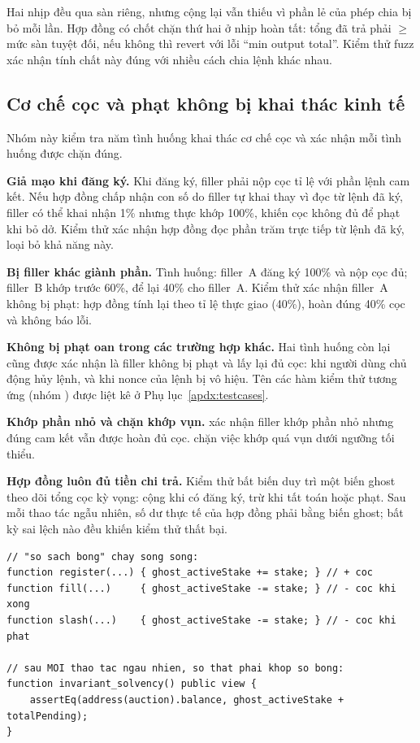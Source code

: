 \documentclass[../DoAn.tex]{subfiles}
\begin{document}
Hai nhịp đều qua sàn riêng, nhưng cộng lại vẫn thiếu vì phần lẻ của phép chia bị bỏ mỗi lần. Hợp đồng có chốt chặn thứ hai ở nhịp hoàn tất: tổng đã trả phải $\geq$ mức sàn tuyệt đối, nếu không thì revert với lỗi ``min output total''. Kiểm thử fuzz  xác nhận tính chất này đúng với nhiều cách chia lệnh khác nhau.

\subsection{Cơ chế cọc và phạt không bị khai thác kinh tế}

Nhóm này kiểm tra năm tình huống khai thác cơ chế cọc và xác nhận mỗi tình huống được chặn đúng.

\textbf{Giả mạo khi đăng ký.} Khi đăng ký, filler phải nộp cọc tỉ lệ với phần lệnh cam kết. Nếu hợp đồng chấp nhận con số do filler tự khai thay vì đọc từ lệnh đã ký, filler có thể khai nhận 1\% nhưng thực khớp 100\%, khiến cọc không đủ để phạt khi bỏ dở. Kiểm thử  xác nhận hợp đồng đọc phần trăm trực tiếp từ lệnh đã ký, loại bỏ khả năng này.

\textbf{Bị filler khác giành phần.} Tình huống: filler~A đăng ký 100\% và nộp cọc đủ; filler~B khớp trước 60\%, để lại 40\% cho filler~A. Kiểm thử  xác nhận filler~A không bị phạt: hợp đồng tính lại theo tỉ lệ thực giao (40\%), hoàn đúng 40\% cọc và không báo lỗi.

\textbf{Không bị phạt oan trong các trường hợp khác.} Hai tình huống còn lại cũng được xác nhận là filler không bị phạt và lấy lại đủ cọc: khi người dùng chủ động hủy lệnh, và khi nonce của lệnh bị vô hiệu. Tên các hàm kiểm thử tương ứng (nhóm ) được liệt kê ở Phụ lục~\ref{apdx:testcases}.

\textbf{Khớp phần nhỏ và chặn khớp vụn.}  xác nhận filler khớp phần nhỏ nhưng đúng cam kết vẫn được hoàn đủ cọc.  chặn việc khớp quá vụn dưới ngưỡng tối thiểu.

\textbf{Hợp đồng luôn đủ tiền chi trả.} Kiểm thử bất biến  duy trì một biến ghost theo dõi tổng cọc kỳ vọng: cộng khi có đăng ký, trừ khi tất toán hoặc phạt. Sau mỗi thao tác ngẫu nhiên, số dư thực tế của hợp đồng phải bằng biến ghost; bất kỳ sai lệch nào đều khiến kiểm thử thất bại.

\begin{lstlisting}
// "so sach bong" chay song song:
function register(...) { ghost_activeStake += stake; } // + coc
function fill(...)     { ghost_activeStake -= stake; } // - coc khi xong
function slash(...)    { ghost_activeStake -= stake; } // - coc khi phat

// sau MOI thao tac ngau nhien, so that phai khop so bong:
function invariant_solvency() public view {
    assertEq(address(auction).balance, ghost_activeStake + totalPending);
}
\end{lstlisting}
\end{document}
